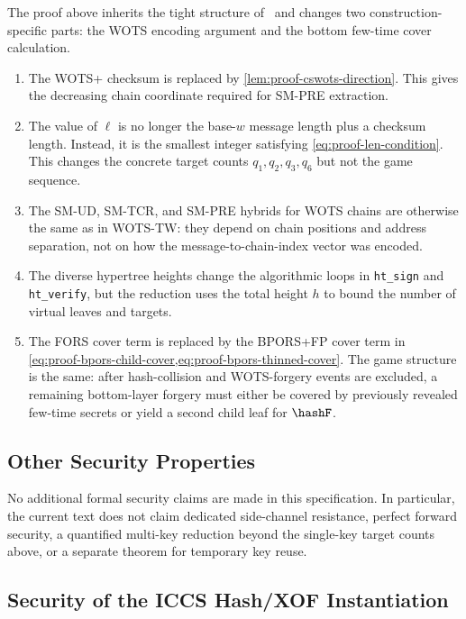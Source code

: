 The proof above inherits the tight \SPHINCSP structure of~\cite{AC:HulKud22}
and changes two construction-specific parts: the WOTS encoding argument and the
bottom few-time cover calculation.
\begin{enumerate}
    \item The \SPHINCSP WOTS+ checksum is replaced by
    \cref{lem:proof-cswots-direction}.  This gives the decreasing chain
    coordinate required for SM-PRE extraction.
    \item The value of $\ell$ is no longer the base-$w$ message length plus a
    checksum length.  Instead, it is the smallest integer satisfying
    \cref{eq:proof-len-condition}.  This changes the concrete target counts
    $q_1,q_2,q_3,q_6$ but not the game sequence.
    \item The SM-UD, SM-TCR, and SM-PRE hybrids for WOTS chains are otherwise
    the same as in WOTS-TW: they depend on chain positions and address
    separation, not on how the message-to-chain-index vector was encoded.
    \item The diverse hypertree heights change the algorithmic loops in
    \texttt{ht\_sign} and \texttt{ht\_verify}, but the reduction uses the total
    height $h$ to bound the number of virtual leaves and targets.
    \item The FORS cover term is replaced by the BPORS+FP cover term in
    \cref{eq:proof-bpors-child-cover,eq:proof-bpors-thinned-cover}.  The game
    structure is the same: after hash-collision and WOTS-forgery events are
    excluded, a remaining bottom-layer forgery must either be covered by
    previously revealed few-time secrets or yield a second child leaf for
    $\hashF$.
\end{enumerate}

\subsection{Other Security Properties}
\label{sec:proof-other-properties}

No additional formal security claims are made in this specification.  In particular,
the current text does not claim dedicated side-channel resistance, perfect
forward security, a quantified multi-key reduction beyond the single-key
target counts above, or a separate theorem for temporary key reuse.

\subsection{Security of the ICCS Hash/XOF Instantiation}
\label{sec:proof-iccs-instantiation}

